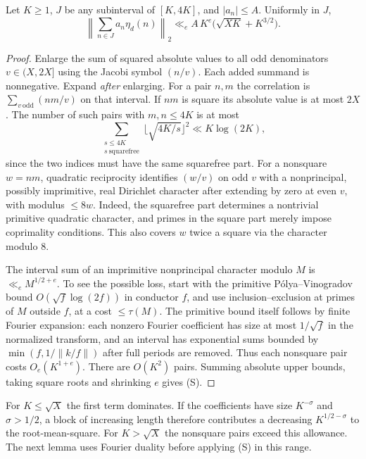 \documentclass[11pt]{article}
\begin{document}
\begin{lem}\label{lem:short}
Let $K\ge1$, $J$ be any subinterval of $[K,4K]$, and $|a_n|\le A$. Uniformly in $J$,
\[
 \left\|\sum_{n\in J}a_n\eta_d(n)\right\|_2
 \ll_e A\, K^e\big(\sqrt{XK}+K^{3/2}\big).
 \tag{S}
\]
\end{lem}
\begin{proof}
Enlarge the sum of squared absolute values to all odd denominators $v\in(X,2X]$ using the Jacobi symbol $(n/v)$. Each added summand is nonnegative. Expand \emph{after} enlarging. For a pair $n,m$ the correlation is $\sum_{v\ \mathrm{odd}}(nm/v)$ on that interval. If $nm$ is square its absolute value is at most $2X$. The number of such pairs with $m,n\le4K$ is at most
\[
 \sum_{\substack{s\le4K\\s\ \mathrm{squarefree}}}\lfloor\sqrt{4K/s}\rfloor^2
 \ll K\log(2K),
\]
since the two indices must have the same squarefree part. For a nonsquare $w=nm$, quadratic reciprocity identifies $(w/v)$ on odd $v$ with a nonprincipal, possibly imprimitive, real Dirichlet character after extending by zero at even $v$, with modulus $\le 8w$. Indeed, the squarefree part determines a nontrivial primitive quadratic character, and primes in the square part merely impose coprimality conditions. This also covers $w$ twice a square via the character modulo $8$.

The interval sum of an imprimitive nonprincipal character modulo $M$ is $\ll_e M^{1/2+e}$. To see the possible loss, start with the primitive P\'olya--Vinogradov bound $O(\sqrt f\log(2f))$ in conductor $f$, and use inclusion--exclusion at primes of $M$ outside $f$, at a cost $\le\tau(M)$. The primitive bound itself follows by finite Fourier expansion: each nonzero Fourier coefficient has size at most $1/\sqrt f$ in the normalized transform, and an interval has exponential sums bounded by $\min(f,1/\|k/f\|)$ after full periods are removed. Thus each nonsquare pair costs $O_e(K^{1+e})$. There are $O(K^2)$ pairs. Summing absolute upper bounds, taking square roots and shrinking $e$ gives (S).
\end{proof}
For $K\le\sqrt X$ the first term dominates. If the coefficients have size $K^{-\sigma}$ and $\sigma>1/2$, a block of increasing length therefore contributes a decreasing $K^{1/2-\sigma}$ to the root-mean-square. For $K>\sqrt X$ the nonsquare pairs exceed this allowance. The next lemma uses Fourier duality before applying (S) in this range.

\newpage
\end{document}
